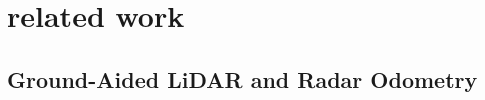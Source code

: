 \section{related work}
\label{sec:relatedwork}
 




\subsection{Ground-Aided LiDAR and Radar Odometry}


